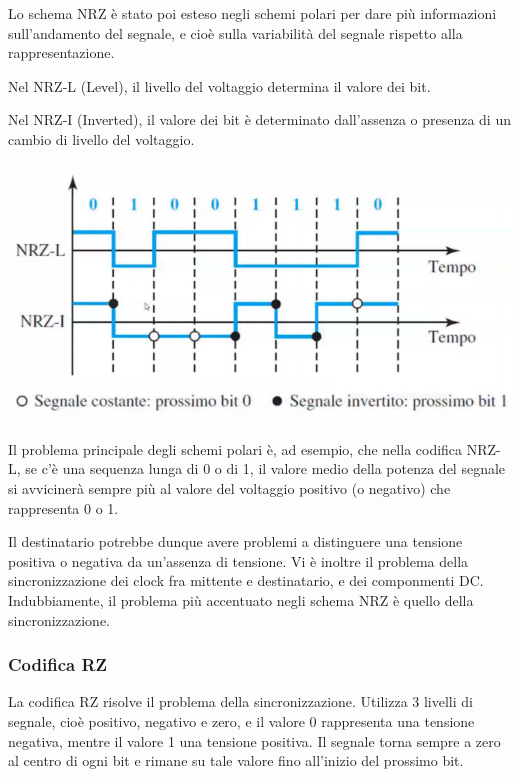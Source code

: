             Lo schema NRZ è stato poi esteso negli schemi polari per dare più informazioni sull'andamento del segnale, e cioè sulla variabilità del segnale rispetto alla rappresentazione.
            
            \vspace{3mm}
            
            Nel NRZ-L (Level), il livello del voltaggio determina il valore dei bit.
            
            Nel NRZ-I (Inverted), il valore dei bit è determinato dall'assenza o presenza di un cambio di livello del voltaggio.
            
            \begin{center}
                \includegraphics[scale=0.5]{images/NRZ-LeI.png}
            \end{center}
        
            Il problema principale degli schemi polari è, ad esempio, che nella codifica NRZ-L, se c'è una sequenza lunga di 0 o di 1, il valore medio della potenza del segnale si avvicinerà sempre più al valore del voltaggio positivo (o negativo) che rappresenta 0 o 1. 
            
            Il destinatario potrebbe dunque avere problemi a distinguere una tensione positiva o negativa da un'assenza di tensione. Vi è inoltre il problema della sincronizzazione dei clock fra mittente e destinatario, e dei componmenti DC. Indubbiamente, il problema più accentuato negli schema NRZ è quello della sincronizzazione.
        
        \subsubsection{Codifica RZ}
        
            La codifica RZ risolve il problema della sincronizzazione. Utilizza 3 livelli di segnale, cioè positivo, negativo e zero, e il valore 0 rappresenta una tensione negativa, mentre il valore 1 una tensione positiva. Il segnale torna sempre a zero al centro di ogni bit e rimane su tale valore fino all'inizio del prossimo bit.
            

